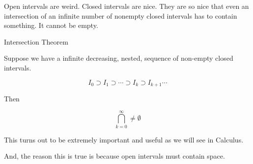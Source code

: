 \documentclass{ximera}
\begin{document}
Open intervals are weird.  Closed intervals are nice.  They are so nice that even an intersection of an infinite number of nonempty closed intervals has to contain something.  It cannot be empty.




\begin{theorem} Intersection Theorem


Suppose we have a infinite decreasing, nested, sequence of non-empty closed intervals.


\[   I_0 \supset    I_1 \supset  \cdots \supset I_{k}   \supset I_{k+1}  \cdots  \]



Then 


\[   \bigcap_{k=0}^{\infty} \ne \emptyset         \]


\end{theorem}













This turns out to be extremely important and useful as we will see in Calculus.


And, the reason this is true is because open intervals must contain space.
\end{document}
